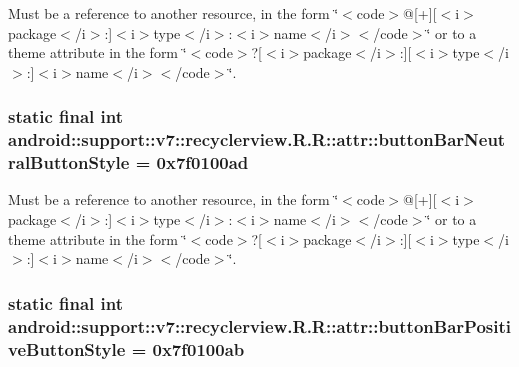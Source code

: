 Must be a reference to another resource, in the form \char`\"{}$<$code$>$@\mbox{[}+\mbox{]}\mbox{[}$<$i$>$package$<$/i$>$:\mbox{]}$<$i$>$type$<$/i$>$:$<$i$>$name$<$/i$>$$<$/code$>$\char`\"{} or to a theme attribute in the form \char`\"{}$<$code$>$?\mbox{[}$<$i$>$package$<$/i$>$:\mbox{]}\mbox{[}$<$i$>$type$<$/i$>$:\mbox{]}$<$i$>$name$<$/i$>$$<$/code$>$\char`\"{}. \hypertarget{classandroid_1_1support_1_1v7_1_1recyclerview_1_1_r_1_1attr_41998e73e5e03ce369b946edd75aba67}{
\subsubsection[{buttonBarNeutralButtonStyle}]{\setlength{\rightskip}{0pt plus 5cm}static final int android::support::v7::recyclerview.R.R::attr::buttonBarNeutralButtonStyle = 0x7f0100ad}}
\label{classandroid_1_1support_1_1v7_1_1recyclerview_1_1_r_1_1attr_41998e73e5e03ce369b946edd75aba67}


Must be a reference to another resource, in the form \char`\"{}$<$code$>$@\mbox{[}+\mbox{]}\mbox{[}$<$i$>$package$<$/i$>$:\mbox{]}$<$i$>$type$<$/i$>$:$<$i$>$name$<$/i$>$$<$/code$>$\char`\"{} or to a theme attribute in the form \char`\"{}$<$code$>$?\mbox{[}$<$i$>$package$<$/i$>$:\mbox{]}\mbox{[}$<$i$>$type$<$/i$>$:\mbox{]}$<$i$>$name$<$/i$>$$<$/code$>$\char`\"{}. \hypertarget{classandroid_1_1support_1_1v7_1_1recyclerview_1_1_r_1_1attr_12554fb692ffbaabc71070d05737df64}{
\subsubsection[{buttonBarPositiveButtonStyle}]{\setlength{\rightskip}{0pt plus 5cm}static final int android::support::v7::recyclerview.R.R::attr::buttonBarPositiveButtonStyle = 0x7f0100ab}}
\label{classandroid_1_1support_1_1v7_1_1recyclerview_1_1_r_1_1attr_12554fb692ffbaabc71070d05737df64}


